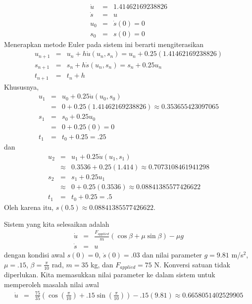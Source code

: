 \begin{description}
\begin{eqnarray*}
\dot{u} & = & 1.41462169238826\\
\dot{s} & = & u\\
u_{0} & = & \dot{s}(0)=0\\
s_{0} & = & s(0)=0
\end{eqnarray*}
Menerapkan metode Euler pada sistem ini berarti mengiterasikan
\begin{eqnarray*}
u_{n+1} & = & u_{n}+h\dot{u}(u_{n},s_{n})=u_{n}+0.25(1.41462169238826)\\
s_{n+1} & = & s_{n}+h\dot{s}(u_{n},s_{n})=s_{n}+0.25u_{n}\\
t_{n+1} & = & t_{n}+h
\end{eqnarray*}
Khususnya,
\begin{eqnarray*}
u_{1} & = & u_{0}+0.25\dot{u}(u_{0},s_{0})\\
 & = & 0+0.25(1.41462169238826)\approx0.353655423097065\\
s_{1} & = & s_{0}+0.25u_{0}\\
 & = & 0+0.25(0)=0\\
t_{1} & = & t_{0}+0.25=.25
\end{eqnarray*}
dan
\begin{eqnarray*}
u_{2} & = & u_{1}+0.25\dot{u}(u_{1},s_{1})\\
 & \approx & 0.3536+0.25(1.414)\approx0.7073108461941298\\
s_{2} & = & s_{1}+0.25u_{1}\\
 & \approx & 0+0.25(0.3536)\approx0.08841385577426622\\
t_{1} & = & t_{0}+0.25=.5
\end{eqnarray*}
Oleh karena itu, $s(0.5)\approx0.08841385577426622$.
\item [{\ref{exc:ode-taylor-21}f:}] Sistem yang kita selesaikan adalah
\begin{eqnarray*}
\dot{u} & = & \frac{F_{applied}}{m}(\cos\beta+\mu\sin\beta)-\mu g\\
\dot{s} & = & u
\end{eqnarray*}
dengan kondisi awal $s(0)=0$, $\dot{s}(0)=.03$ dan nilai parameter
$g=9.81$ m/s$^{2}$, $\mu=.15$, $\beta=\frac{\pi}{10}$ rad, $m=35$
kg, dan $F_{applied}=75$ N. Konversi satuan tidak diperlukan. Kita
memasukkan nilai parameter ke dalam sistem untuk memperoleh masalah
nilai awal
\begin{eqnarray*}
\dot{u} & = & \frac{75}{35}\left(\cos\left(\frac{\pi}{10}\right)+.15\sin\left(\frac{\pi}{10}\right)\right)-.15(9.81)\approx0.6658051402529905\\

\end{eqnarray*}
\end{description}
